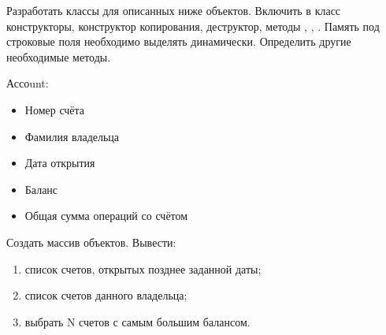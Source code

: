 
Разработать классы для описанных ниже объектов. Включить в класс
конструкторы, конструктор копирования, деструктор, методы ,
, . Память под строковые поля необходимо выделять
динамически. Определить другие необходимые методы.

Ассоunt:
\begin{itemize}
\item Номер счёта
\item Фамилия владельца
\item Дата открытия
\item Баланс
\item Общая сумма операций со счётом
\end{itemize}

Создать массив объектов. Вывести:
\begin{enumerate}
\item список счетов, открытых позднее заданной даты;
\item список счетов данного владельца;
\item выбрать N счетов с самым большим балансом.
\end{enumerate}
